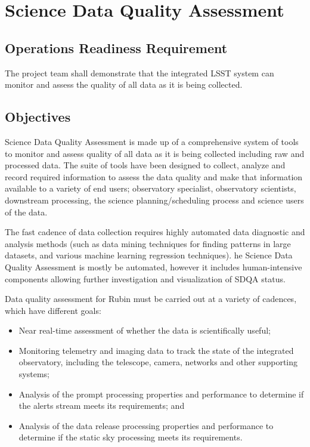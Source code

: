 \section{Science Data Quality Assessment}  \label{sec:sdqa}


\subsection{Operations Readiness Requirement}

The project team shall demonstrate that the integrated LSST system can monitor and assess the quality of all data as it is being collected.

\subsection{Objectives} 

Science Data Quality Assessment is made up of a comprehensive system of tools to monitor and assess quality of all data as it is being collected including raw and processed data. The suite of tools have been designed to collect, analyze and record required information to assess the data quality and make that information available to a variety of end users; observatory specialist, observatory scientists, downstream processing, the science planning/scheduling process and science users of the data. 

The fast cadence of data collection requires highly automated data diagnostic and analysis methods (such as data mining techniques for finding patterns in large datasets, and various machine learning regression techniques). he Science Data Quality Assessment is mostly be automated, however it includes human-intensive components allowing further investigation and visualization of SDQA status.

Data quality assessment for Rubin must be carried out at a variety of cadences, which have different goals:

\begin{itemize}

	\item Near real-time assessment of whether the data is scientifically useful;
	\item Monitoring telemetry and imaging data to track the state of the integrated observatory, including the telescope, camera, networks and other supporting systems;
	\item Analysis of the prompt processing properties and performance to determine if the alerts stream meets its requirements; and
	\item Analysis of the data release processing properties and performance to determine if the static sky processing meets its requirements.
	
\end{itemize}

